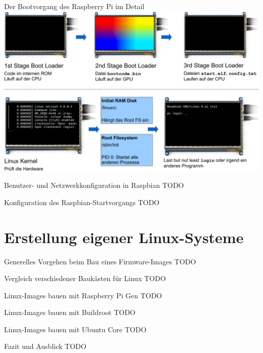\begin{frame}{Der Bootvorgang des Raspberry Pi im Detail}
    \includegraphics[width=\textwidth]{8-linux/img/pi-bootvorgang}
\end{frame}

\begin{frame}{Benutzer- und Netzwerkkonfiguration in Raspbian}
    TODO
\end{frame}

\begin{frame}{Konfiguration des Raspbian-Startvorgangs}
    TODO
\end{frame}

\section{Erstellung eigener Linux-Systeme}

\begin{frame}{Generelles Vorgehen beim Bau eines Firmware-Images}
    TODO
\end{frame}

\begin{frame}{Vergleich verschiedener Baukästen für Linux}
    TODO
\end{frame}

\begin{frame}{Linux-Images bauen mit Raspberry Pi Gen}
    TODO
\end{frame}

\begin{frame}{Linux-Images bauen mit Buildroot}
    TODO
\end{frame}

\begin{frame}{Linux-Images bauen mit Ubuntu Core}
    TODO
\end{frame}

\begin{frame}{Fazit und Ausblick}
    TODO
\end{frame}

